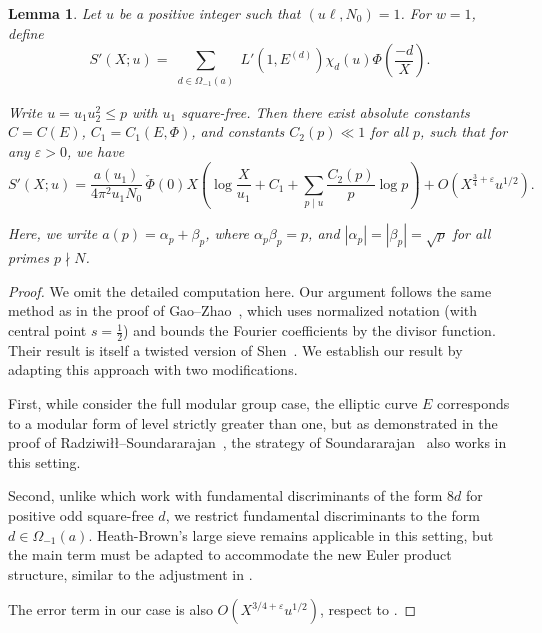 \documentclass[12pt,reqno]{amsart}
\numberwithin{equation}{section}
\theoremstyle{plain}
\newtheorem{lemma}[theorem]{Lemma}
\theoremstyle{definition}
\theoremstyle{remark}
\begin{document}
\begin{lemma}\label{lemma:twist}
Let \( u \) be a positive integer such that \( (u\ell, N_0) = 1 \).
For \( w = 1 \), define
\begin{equation*}
  S'(X; u) = \sum_{\substack{d \in \Omega_{-1}(a)}}
  L'\left(1, E^{(d)}\right) \chi_d(u)
  \Phi\left(\frac{-d}{X}\right).
\end{equation*}

Write \( u = u_1 u_2^2 \leq p \) with \( u_1 \) square-free.
Then there exist absolute constants \( C = C(E) \), \( C_1 = C_1(E, \Phi) \), and constants \( C_2(p) \ll 1 \) for all \( p \), such that for any \( \varepsilon > 0 \), we have
\begin{equation*}
  S'(X; u) = \frac{a(u_1)}{4\pi^2 u_1 N_0} \,
  \check{\Phi}(0) X \left( \log \frac{X}{u_1} + C_1 + \sum_{p \mid u} \frac{C_2(p)}{p} \log p \right)
  + O\left(X^{\frac{3}{4} + \varepsilon} u^{1/2}\right).
\end{equation*}

Here, we write \( a(p) = \alpha_p + \beta_p \), where \( \alpha_p \beta_p = p \), and \( |\alpha_p| = |\beta_p| = \sqrt{p} \) for all primes \( p \nmid N \).
\end{lemma}

\begin{proof}
We omit the detailed computation here. Our argument follows the same method as in the proof of Gao--Zhao~\cite[Lemma 3.3]{GaoZhao2024}, which uses normalized notation (with central point \( s = \frac{1}{2} \)) and bounds the Fourier coefficients by the divisor function. Their result is itself a twisted version of Shen~\cite[Theorem 1.2]{Shen2022}. We establish our result by adapting this approach with two modifications.

First, while \cite{GaoZhao2024,Shen2022} consider the full modular group case, the elliptic curve $E$ corresponds to a modular form of level strictly greater than one, but as demonstrated in the proof of Radziwi\l\l--Soundararajan~\cite[Proposition 1]{RadziwillSoundararajan2015}, the strategy of Soundararajan~\cite{Soundararajan2000} also works in this setting.

Second, unlike \cite{GaoZhao2024,Shen2022} which work with fundamental discriminants of the form $8d$ for positive odd square-free $d$, we restrict fundamental discriminants to the form $d \in \Omega_{-1}(a)$. Heath-Brown's large sieve \cite{HeathBrown1995} remains applicable in this setting, but the main term must be adapted to accommodate the new Euler product structure, similar to the adjustment in \cite{RadziwillSoundararajan2015}.

The error term in our case is also $O(X^{3/4+\varepsilon}u^{1/2})$, respect to \cite{GaoZhao2024}.
\end{proof}
\end{document}
